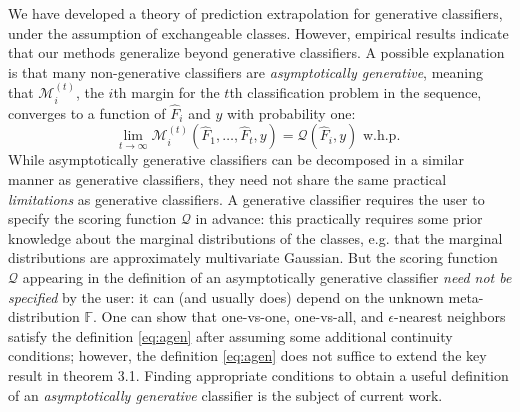 \documentclass{article}
\begin{document}
We have developed a theory of prediction extrapolation for generative classifiers,
under the assumption of exchangeable classes.  However, empirical results indicate
that our methods generalize beyond generative classifiers.
A possible explanation is that many non-generative classifiers are \emph{asymptotically generative},
meaning that $\mathcal{M}_i^{(t)}$, the $i$th margin for the $t$th classification problem in the sequence,
converges to a function of $\hat{F}_i$ and $y$ with probability one:
\begin{equation}\label{eq:agen}
\lim_{t \to \infty} \mathcal{M}_i^{(t)}(\hat{F}_1,\hdots, \hat{F}_t, y) = \mathcal{Q}(\hat{F}_i, y) \text{ w.h.p. }
\end{equation}
While asymptotically generative classifiers can be decomposed in a similar manner as generative classifiers,
they need not share the same practical \emph{limitations} as generative classifiers.
A generative classifier requires the user to specify the scoring function $\mathcal{Q}$ in advance:
this practically requires some prior knowledge about the marginal distributions of the classes,
e.g. that the marginal distributions are approximately multivariate Gaussian.
But the scoring function $\mathcal{Q}$ appearing in the definition of an asymptotically generative classifier
\emph{need not be specified} by the user: 
it can (and usually does) depend on the unknown meta-distribution $\mathbb{F}$.
One can show that one-vs-one, one-vs-all, and $\epsilon$-nearest neighbors satisfy the definition \eqref{eq:agen}
after assuming some additional continuity conditions; however, the definition \eqref{eq:agen} does not
suffice to extend the key result in theorem 3.1.  Finding appropriate conditions to obtain a useful
definition of an \emph{asymptotically generative} classifier is the subject of current work.
\end{document}
